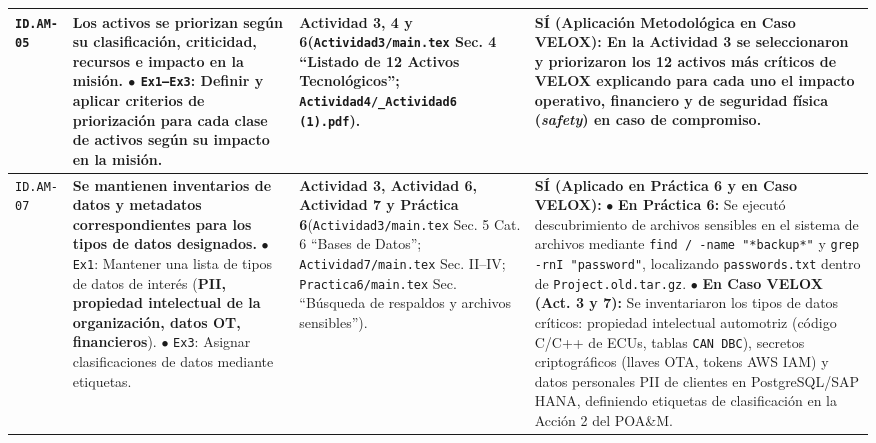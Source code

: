 \documentclass[letterpaper,11pt]{article}
\begin{document}
\begin{longtable}{|C{1.5cm}|L{5.3cm}|L{4.3cm}|L{5.8cm}|}
\texttt{ID.AM-05} &
\textbf{Los activos se priorizan según su clasificación, criticidad, recursos e impacto en la misión.}\newline
$\bullet$ \texttt{Ex1--Ex3}: Definir y aplicar criterios de priorización para cada clase de activos según su impacto en la misión. &
\textbf{Actividad 3, 4 y 6}\newline (\texttt{Actividad3/main.tex} Sec. 4 ``Listado de 12 Activos Tecnológicos''; \texttt{Actividad4/\_Actividad6 (1).pdf}). &
\textbf{SÍ (Aplicación Metodológica en Caso VELOX):}\newline
En la Actividad 3 se seleccionaron y priorizaron los 12 activos más críticos de VELOX explicando para cada uno el impacto operativo, financiero y de seguridad física (\textit{safety}) en caso de compromiso. \\
\hline

\texttt{ID.AM-07} &
\textbf{Se mantienen inventarios de datos y metadatos correspondientes para los tipos de datos designados.}\newline
$\bullet$ \texttt{Ex1}: Mantener una lista de tipos de datos de interés (\textbf{PII, propiedad intelectual de la organización, datos OT, financieros}).\newline
$\bullet$ \texttt{Ex3}: Asignar clasificaciones de datos mediante etiquetas. &
\textbf{Actividad 3, Actividad 6, Actividad 7 y Práctica 6}\newline (\texttt{Actividad3/main.tex} Sec. 5 Cat. 6 ``Bases de Datos''; \texttt{Actividad7/main.tex} Sec. II--IV; \texttt{Practica6/main.tex} Sec. ``Búsqueda de respaldos y archivos sensibles''). &
\textbf{SÍ (Aplicado en Práctica 6 y en Caso VELOX):}\newline
$\bullet$ \textbf{En Práctica 6:} Se ejecutó descubrimiento de archivos sensibles en el sistema de archivos mediante \texttt{find / -name "*backup*"} y \texttt{grep -rnI "password"}, localizando \texttt{passwords.txt} dentro de \texttt{Project.old.tar.gz}.\newline
$\bullet$ \textbf{En Caso VELOX (Act. 3 y 7):} Se inventariaron los tipos de datos críticos: propiedad intelectual automotriz (código C/C++ de ECUs, tablas \texttt{CAN DBC}), secretos criptográficos (llaves OTA, tokens AWS IAM) y datos personales PII de clientes en PostgreSQL/SAP HANA, definiendo etiquetas de clasificación en la Acción 2 del POA\&M. \\
\hline


\end{longtable}
\end{document}
